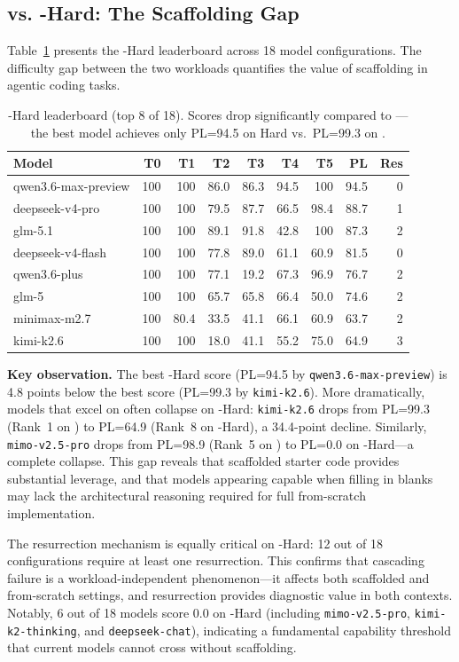 \subsection{\yatcc{} vs. \yatcc{}-Hard: The Scaffolding Gap}

Table~\ref{tab:hard} presents the \yatcc{}-Hard leaderboard across 18 model configurations.
The difficulty gap between the two workloads quantifies the value of scaffolding in agentic coding tasks.

\begin{table}[t]
\centering
\small
\begin{tabular}{lrrrrrrrr}
\toprule
\textbf{Model} & \textbf{T0} & \textbf{T1} & \textbf{T2} & \textbf{T3} & \textbf{T4} & \textbf{T5} & \textbf{PL} & \textbf{Res} \\
\midrule
qwen3.6-max-preview & 100 & 100 & 86.0 & 86.3 & 94.5 & 100 & 94.5 & 0 \\
deepseek-v4-pro & 100 & 100 & 79.5 & 87.7 & 66.5 & 98.4 & 88.7 & 1 \\
glm-5.1 & 100 & 100 & 89.1 & 91.8 & 42.8 & 100 & 87.3 & 2 \\
deepseek-v4-flash & 100 & 100 & 77.8 & 89.0 & 61.1 & 60.9 & 81.5 & 0 \\
qwen3.6-plus & 100 & 100 & 77.1 & 19.2 & 67.3 & 96.9 & 76.7 & 2 \\
glm-5 & 100 & 100 & 65.7 & 65.8 & 66.4 & 50.0 & 74.6 & 2 \\
minimax-m2.7 & 100 & 80.4 & 33.5 & 41.1 & 66.1 & 60.9 & 63.7 & 2 \\
kimi-k2.6 & 100 & 100 & 18.0 & 41.1 & 55.2 & 75.0 & 64.9 & 3 \\
\bottomrule
\end{tabular}
\caption{\yatcc{}-Hard leaderboard (top 8 of 18). Scores drop significantly compared to \yatcc{}---the best model achieves only PL=94.5 on Hard vs.\ PL=99.3 on \yatcc{}.}
\label{tab:hard}
\end{table}

\textbf{Key observation.}
The best \yatcc{}-Hard score (PL=94.5 by \texttt{qwen3.6-max-preview}) is 4.8 points below the best \yatcc{} score (PL=99.3 by \texttt{kimi-k2.6}).
More dramatically, models that excel on \yatcc{} often collapse on \yatcc{}-Hard: \texttt{kimi-k2.6} drops from PL=99.3 (Rank~1 on \yatcc{}) to PL=64.9 (Rank~8 on \yatcc{}-Hard), a 34.4-point decline.
Similarly, \texttt{mimo-v2.5-pro} drops from PL=98.9 (Rank~5 on \yatcc{}) to PL=0.0 on \yatcc{}-Hard---a complete collapse.
This gap reveals that scaffolded starter code provides substantial leverage, and that models appearing capable when filling in blanks may lack the architectural reasoning required for full from-scratch implementation.

The resurrection mechanism is equally critical on \yatcc{}-Hard: 12 out of 18 configurations require at least one resurrection.
This confirms that cascading failure is a workload-independent phenomenon---it affects both scaffolded and from-scratch settings, and resurrection provides diagnostic value in both contexts.
Notably, 6 out of 18 models score 0.0 on \yatcc{}-Hard (including \texttt{mimo-v2.5-pro}, \texttt{kimi-k2-thinking}, and \texttt{deepseek-chat}), indicating a fundamental capability threshold that current models cannot cross without scaffolding.